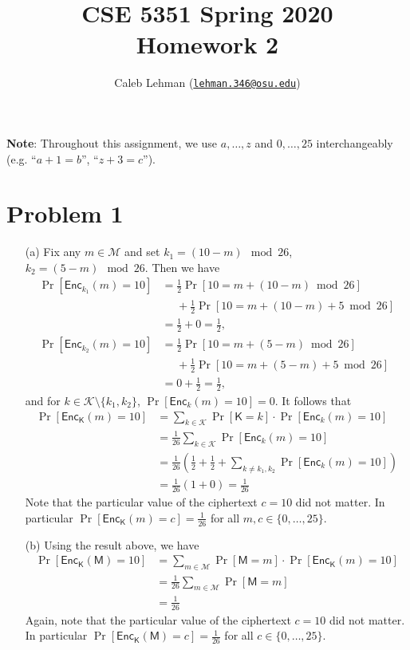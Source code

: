 \documentclass[12pt]{article}
\title{%
CSE 5351 Spring 2020\\
Homework 2
}
\author{%
Caleb Lehman
(\href{mailto:lehman.346@osu.edu}{\texttt{lehman.346@osu.edu}})
}
\date{%
}
\numberwithin{equation}{section}
\theoremstyle{plain}
\newcommand{\set}[1]{\{ #1 \}}
\DeclareMathOperator*{\prob}{Pr}
\newcommand{\ptexts}{\mathcal{M}}
\newcommand{\ptext}{\algo{M}}
\newcommand{\keys}{\mathcal{K}}
\newcommand{\key}{\algo{K}}
\newcommand{\algo}[1]{\mathsf{#1}}
\newcommand{\enc}{\algo{Enc}}
\begin{document}
\maketitle

\textbf{Note}: Throughout this assignment,
we use $a, \ldots, z$ and $0, \ldots, 25$ interchangeably (e.g. ``$a + 1 = b$'', ``$z + 3 = c$'').

\section*{Problem 1}

\begin{enumerate}
    \item[(a)] Fix any $m \in \ptexts$ and set $k_1 = (10 - m) \mod 26$, $k_2 = (5 - m) \mod 26$.
    Then we have
    \begin{align*}
        \prob[\enc_{k_1}(m) = 10]
            &= \frac{1}{2} \prob[10 = m + (10 - m) \bmod 26]\\
            &\mathrel{\phantom{=}} \mathrel{+} \frac{1}{2} \prob[10 = m + (10 - m) + 5 \bmod 26]\\
            &= \frac{1}{2} + 0 = \frac{1}{2},\\
        \prob[\enc_{k_2}(m) = 10]
            &= \frac{1}{2} \prob[10 = m + (5 - m) \bmod 26]\\
            &\mathrel{\phantom{=}} \mathrel{+} \frac{1}{2} \prob[10 = m + (5 - m) + 5 \bmod 26]\\
            &= 0 + \frac{1}{2} = \frac{1}{2},
    \end{align*}
    and for $k \in \keys \setminus \set{ k_1, k_2 }$, $\prob[\enc_{k}(m) = 10] = 0$.
    It follows that
    \begin{align*}
        \prob[\enc_{\key}(m) = 10]
            &= \sum_{k \in \keys}{ \prob[\key = k] \cdot \prob[\enc_{k}(m) = 10] }\\
            &= \frac{1}{26} \sum_{k \in \keys} { \prob[\enc_{k}(m) = 10] }\\
            &= \frac{1}{26} ( \frac{1}{2} + \frac{1}{2} + \sum_{k \neq k_1, k_2} { \prob[\enc_{k}(m) = 10] } )\\
            &= \frac{1}{26} ( 1 + 0 ) = \frac{1}{26}
    \end{align*}
    Note that the particular value of the ciphertext $c = 10$ did not matter.
    In particular $\prob[\enc_{\key}(m) = c] = \frac{1}{26}$
    for all $m, c \in \set{ 0, \ldots, 25 }$.

    \item[(b)] Using the result above, we have
    \begin{align*}
        \prob[\enc_{\key}(\ptext) = 10]
            &= \sum_{m \in \ptexts}{ \prob[\ptext = m] \cdot \prob[\enc_{\key}(m) = 10] }\\
            &= \frac{1}{26} \sum_{m \in \ptexts}{ \prob[\ptext = m] }\\
            &= \frac{1}{26}
    \end{align*}
    Again, note that the particular value of the ciphertext $c = 10$ did not matter.
    In particular $\prob[\enc_{\key}(\ptext) = c] = \frac{1}{26}$
    for all $c \in \set{ 0, \ldots, 25 }$.
\end{enumerate}
\end{document}
